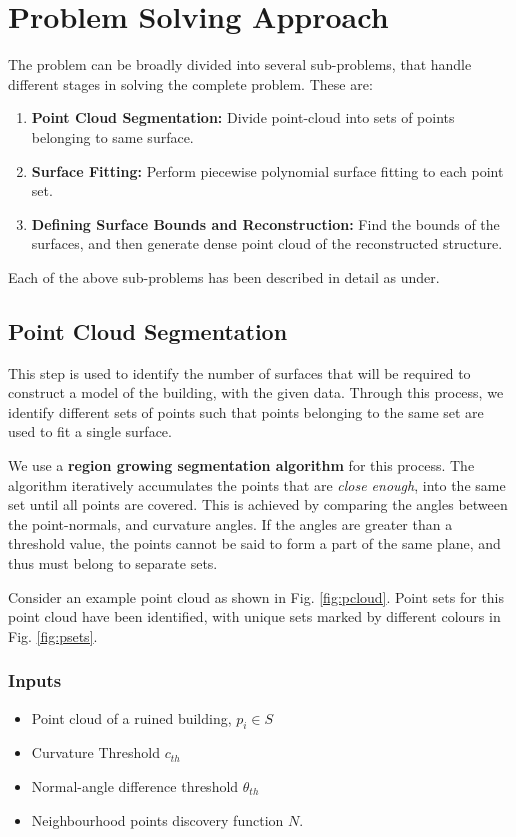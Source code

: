 \documentclass[12pt,a4paper]{article}
\begin{document}
    \section{Problem Solving Approach}
    
    The problem can be broadly divided into several sub-problems, that handle different stages in solving the complete problem. These are:
    
    \begin{enumerate}
        \item \textbf{Point Cloud Segmentation:} Divide point-cloud into sets of points belonging to same surface.
        \item \textbf{Surface Fitting:} Perform piecewise polynomial surface fitting to each point set.
        \item \textbf{Defining Surface Bounds and Reconstruction:} Find the bounds of the surfaces, and then generate dense point cloud of the reconstructed structure.
    \end{enumerate}
    
    Each of the above sub-problems has been described in detail as under.
    
    \subsection{Point Cloud Segmentation}
    
    This step is used to identify the number of surfaces that will be required to construct a model of the building, with the given data. Through this process, we identify different sets of points such that points belonging to the same set are used to fit a single surface.
    
    We use a \textbf{region growing segmentation algorithm} for this process. The algorithm iteratively accumulates the points that are \textit{close enough}, into the same set until all points are covered. This is achieved by comparing the angles between the point-normals, and curvature angles. If the angles are greater than a threshold value, the points cannot be said to form a part of the same plane, and thus must belong to separate sets.
    
    Consider an example point cloud as shown in Fig. \ref{fig:pcloud}. Point sets for this point cloud have been identified, with unique sets marked by different colours in Fig. \ref{fig:psets}.
    

    \subsubsection{Inputs}
    \begin{itemize}
        \itemsep0em 
        \item Point cloud of a ruined building, $p_i \in S$
        \item Curvature Threshold $c_{th}$
        \item Normal-angle difference threshold $\theta_{th}$
        \item Neighbourhood points discovery function $N$.
    \end{itemize}
    
\end{document}
